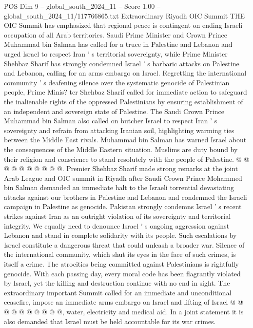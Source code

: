 \begin{textsample}{POS Dim 9 – global\_south\_2024\_11 – Score 1.00 – global\_south\_2024\_11/117766865.txt}  \label{ex:f9_pos_149}
Extraordinary Riyadh OIC Summit THE OIC Summit has emphasized that regional peace is contingent on ending Israeli occupation of all Arab territories.
Saudi Prime Minister and Crown Prince Muhammad bin Salman has called for a truce in Palestine and Lebanon and urged Israel to respect Iran ' s territorial sovereignty, while Prime Minister Shehbaz Sharif has strongly condemned Israel ' s barbaric attacks on Palestine and Lebanon, calling for an arms embargo on Israel.
Regretting the international community ' s deafening silence over the systematic genocide of Palestinian people, Prime Minis? ter Shehbaz Sharif called for immediate action to safeguard the inalienable rights of the oppressed Palestinians by ensuring establishment of an independent and sovereign state of Palestine.
The Saudi Crown Prince Muhammad bin Salman also called on butcher Israel to respect Iran ' s sovereignty and refrain from attacking Iranian soil, highlighting warming ties between the Middle East rivals.
Muhammad bin Salman has warned Israel about the consequences of the Middle Eastern situation.
Muslims are duty bound by their religion and conscience to stand resolutely with the people of Palestine. @ @ @ @ @ @ @ @ @ @.
Premier Shehbaz Sharif made strong remarks at the joint Arab League and OIC summit in Riyadh after Saudi Crown Prince Mohammed bin Salman demanded an immediate halt to the Israeli torrential devastating attacks against our brothers in Palestine and Lebanon and condemned the Israeli campaign in Palestine as genocide.
Pakistan strongly condemns Israel ' s recent strikes against Iran as an outright violation of its sovereignty and territorial integrity.
We equally need to denounce Israel ' s ongoing aggression against Lebanon and stand in complete solidarity with its people.
Such escalations by Israel constitute a dangerous threat that could unleash a broader war.
Silence of the international community, which shut its eyes in the face of such crimes, is itself a crime.
The atrocities being committed against Palestinians is rightfully genocide.
With each passing day, every moral code has been flagrantly violated by Israel, yet the killing and destruction continue with no end in sight.
The extraordinary important Summit called for an immediate and unconditional ceasefire, impose an immediate arms embargo on Israel and lifting of Israel @ @ @ @ @ @ @ @ @ @, water, electricity and medical aid.
In a joint statement it is also demanded that Israel must be held accountable for its war crimes.

\end{textsample}
